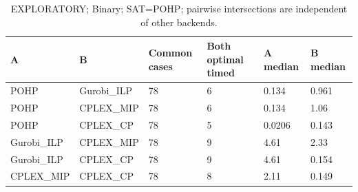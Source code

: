 \begin{table}[htbp]
\centering
\caption{EXPLORATORY; Binary; SAT=POHP; pairwise intersections are independent of other backends.}
\label{tab:p2b-Binary-exploratory-pairs}
\begin{tabular}{llllll}
\hline
A & B & Common cases & Both optimal timed & A median & B median \\
\hline
POHP & Gurobi\_ILP & 78 & 6 & 0.134 & 0.961 \\
POHP & CPLEX\_MIP & 78 & 6 & 0.134 & 1.06 \\
POHP & CPLEX\_CP & 78 & 5 & 0.0206 & 0.143 \\
Gurobi\_ILP & CPLEX\_MIP & 78 & 9 & 4.61 & 2.33 \\
Gurobi\_ILP & CPLEX\_CP & 78 & 9 & 4.61 & 0.154 \\
CPLEX\_MIP & CPLEX\_CP & 78 & 8 & 2.11 & 0.149 \\
\hline
\end{tabular}
\end{table}

